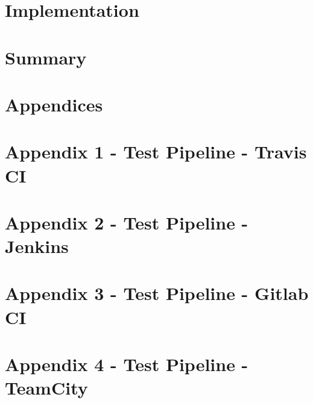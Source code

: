 \documentclass[12pt, a4paper]{report}
\begin{document}
\chapter{Implementation}\label{chapter:implementation}


\chapter{Summary}\label{chapter:summary} 


\pagebreak
{}
{}
\printbibliography

\pagebreak

\appendix
{}
\chapter*{Appendices}
\renewcommand{\thechapter}{\arabic{chapter}}

\label{chapter:appendix-travis}
{\let\clearpage\relax\chapter*{Appendix 1 - Test Pipeline - Travis CI}}


\clearpage
{}
{}\label{chapter:appendix-jenkins}
\chapter*{Appendix 2 - Test Pipeline - Jenkins}


\clearpage
{}
{}\label{chapter:appendix-gitlab}
\chapter*{Appendix 3 - Test Pipeline - Gitlab CI}


\clearpage
{}
{}\label{chapter:appendix-tc}
\chapter*{Appendix 4 - Test Pipeline - TeamCity}

\end{document}
